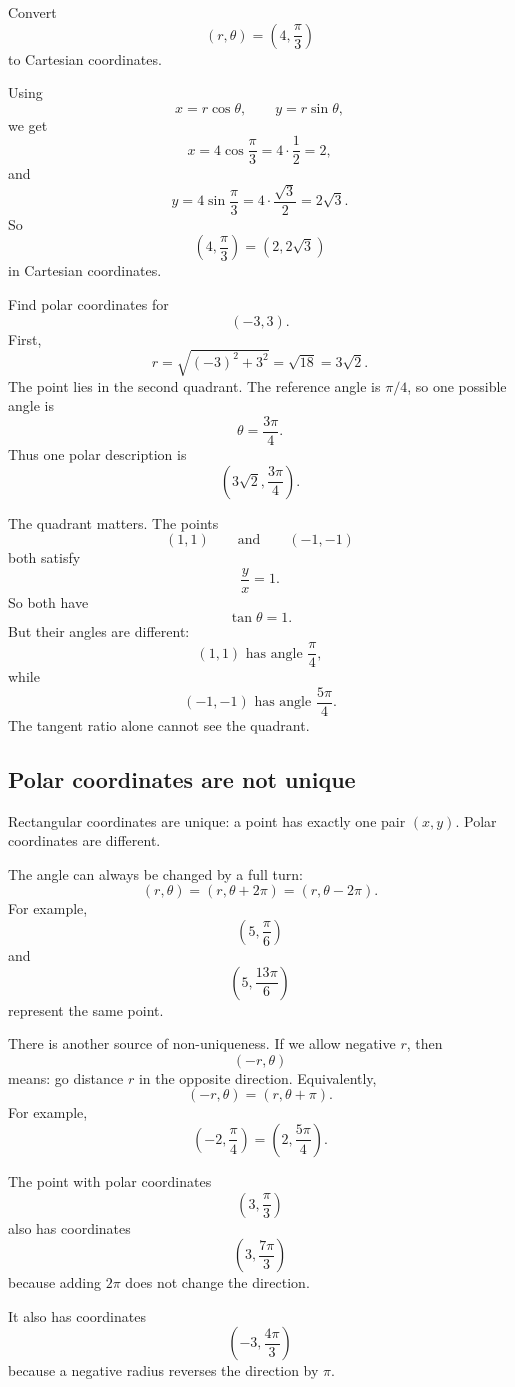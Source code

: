 \begin{example}
Convert
\[
    (r,\theta)=\left(4,\frac{\pi}{3}\right)
\]
to Cartesian coordinates.

Using
\[
    x=r\cos\theta,\qquad y=r\sin\theta,
\]
we get
\[
    x=4\cos\frac{\pi}{3}=4\cdot\frac12=2,
\]
and
\[
    y=4\sin\frac{\pi}{3}=4\cdot\frac{\sqrt3}{2}=2\sqrt3.
\]
So
\[
    \left(4,\frac{\pi}{3}\right)
    =
    (2,2\sqrt3)
\]
in Cartesian coordinates.
\end{example}

\begin{example}
Find polar coordinates for
\[
    (-3,3).
\]
First,
\[
    r=\sqrt{(-3)^2+3^2}=\sqrt{18}=3\sqrt2.
\]
The point lies in the second quadrant.  The reference angle is \(\pi/4\), so one possible
angle is
\[
    \theta=\frac{3\pi}{4}.
\]
Thus one polar description is
\[
    \left(3\sqrt2,\frac{3\pi}{4}\right).
\]
\end{example}

The quadrant matters.  The points
\[
    (1,1)
    \qquad\text{and}\qquad
    (-1,-1)
\]
both satisfy
\[
    \frac{y}{x}=1.
\]
So both have
\[
    \tan\theta=1.
\]
But their angles are different:
\[
    (1,1) \text{ has angle } \frac{\pi}{4},
\]
while
\[
    (-1,-1) \text{ has angle } \frac{5\pi}{4}.
\]
The tangent ratio alone cannot see the quadrant.

\subsection{Polar coordinates are not unique}

Rectangular coordinates are unique: a point has exactly one pair \((x,y)\).  Polar
coordinates are different.

The angle can always be changed by a full turn:
\[
    (r,\theta)=(r,\theta+2\pi)=(r,\theta-2\pi).
\]
For example,
\[
    \left(5,\frac{\pi}{6}\right)
\]
and
\[
    \left(5,\frac{13\pi}{6}\right)
\]
represent the same point.

There is another source of non-uniqueness.  If we allow negative \(r\), then
\[
    (-r,\theta)
\]
means: go distance \(r\) in the opposite direction.  Equivalently,
\[
\boxed{
    (-r,\theta)=(r,\theta+\pi).
}
\]
For example,
\[
    \left(-2,\frac{\pi}{4}\right)
    =
    \left(2,\frac{5\pi}{4}\right).
\]

\begin{example}
The point with polar coordinates
\[
    \left(3,\frac{\pi}{3}\right)
\]
also has coordinates
\[
    \left(3,\frac{7\pi}{3}\right)
\]
because adding \(2\pi\) does not change the direction.

It also has coordinates
\[
    \left(-3,\frac{4\pi}{3}\right)
\]
because a negative radius reverses the direction by \(\pi\).
\end{example}

